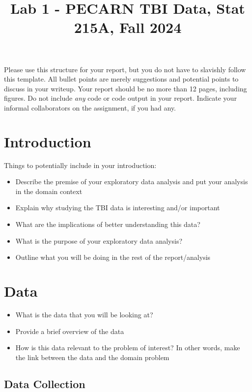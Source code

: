 \documentclass[10pt,letterpaper]{article}
\title{Lab 1 - PECARN TBI Data, Stat 215A, Fall 2024\vspace{-2em}}
\begin{document}
\maketitle

Please use this structure for your report, but you do not have to
slavishly follow this template. All bullet points are merely suggestions
and potential points to discuss in your writeup. Your report should be
no more than 12 pages, including figures. Do not include \emph{any} code
or code output in your report. Indicate your informal collaborators on
the assignment, if you had any.

\section{Introduction}\label{introduction}

Things to potentially include in your introduction:

\begin{itemize}
\item Describe the premise of your exploratory data analysis and put your analysis in the domain context
\item Explain why studying the TBI data is interesting and/or important
\item What are the implications of better understanding this data?
\item What is the purpose of your exploratory data analysis?
\item Outline what you will be doing in the rest of the report/analysis
\end{itemize}


\section{Data}\label{data}

\begin{itemize}
\item What is the data that you will be looking at?
\item Provide a brief overview of the data
\item How is this data relevant to the problem of interest? In other words, make the link between the data and the domain problem
\end{itemize}

\subsection{Data Collection}\label{data-collection}
\end{document}
